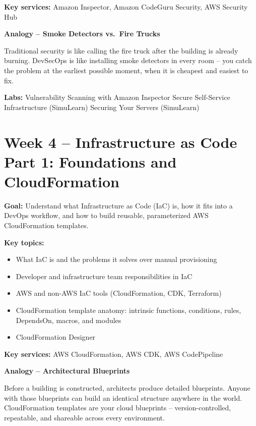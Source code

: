 \documentclass[12pt,a4paper]{article}
\begin{document}
\textbf{Key services:} Amazon Inspector, Amazon CodeGuru Security, AWS Security Hub

\begin{analogybox}
\textbf{Analogy -- Smoke Detectors vs.\ Fire Trucks}

Traditional security is like calling the fire truck after the building is already
burning. DevSecOps is like installing smoke detectors in every room -- you catch
the problem at the earliest possible moment, when it is cheapest and easiest to fix.
\end{analogybox}

\textbf{Labs:} Vulnerability Scanning with Amazon Inspector \textbullet{}
Secure Self-Service Infrastructure (SimuLearn) \textbullet{}
Securing Your Servers (SimuLearn)

\newpage

\section{Week 4 -- Infrastructure as Code Part 1: Foundations and CloudFormation}

\textbf{Goal:} Understand what Infrastructure as Code (IaC) is, how it fits into a
DevOps workflow, and how to build reusable, parameterized AWS CloudFormation templates.

\textbf{Key topics:}
\begin{itemize}[leftmargin=1.5em]
  \item What IaC is and the problems it solves over manual provisioning
  \item Developer and infrastructure team responsibilities in IaC
  \item AWS and non-AWS IaC tools (CloudFormation, CDK, Terraform)
  \item CloudFormation template anatomy: intrinsic functions, conditions,
        rules, DependsOn, macros, and modules
  \item CloudFormation Designer
\end{itemize}

\textbf{Key services:} AWS CloudFormation, AWS CDK, AWS CodePipeline

\begin{analogybox}
\textbf{Analogy -- Architectural Blueprints}

Before a building is constructed, architects produce detailed blueprints. Anyone
with those blueprints can build an identical structure anywhere in the world.
CloudFormation templates are your cloud blueprints -- version-controlled,
repeatable, and shareable across every environment.
\end{analogybox}
\end{document}
